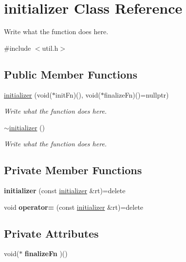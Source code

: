 \hypertarget{classinitializer}{\section{initializer Class Reference}
\label{classinitializer}
}


Write what the function does here.  




{\ttfamily \#include $<$util.\+h$>$}

\subsection*{Public Member Functions}
\begin{DoxyCompactItemize}
\item 
\hyperlink{classinitializer_ad7eff8ec9662dda6c90a5eebbb5bb774}{initializer} (void($\ast$init\+Fn)(), void($\ast$finalize\+Fn)()=nullptr)
\begin{DoxyCompactList}\small\item\em Write what the function does here. \end{DoxyCompactList}\item 
\hyperlink{classinitializer_a9ac296c0a8420f783af46a77792f4253}{$\sim$initializer} ()
\begin{DoxyCompactList}\small\item\em Write what the function does here. \end{DoxyCompactList}\end{DoxyCompactItemize}
\subsection*{Private Member Functions}
\begin{DoxyCompactItemize}
\item 
\hypertarget{classinitializer_a040920f2a1db4d0545d84c81ec6319d9}{{\bfseries initializer} (const \hyperlink{classinitializer}{initializer} \&rt)=delete}\label{classinitializer_a040920f2a1db4d0545d84c81ec6319d9}

\item 
\hypertarget{classinitializer_a622a590c3eeac8414877886cddb3c133}{void {\bfseries operator=} (const \hyperlink{classinitializer}{initializer} \&rt)=delete}\label{classinitializer_a622a590c3eeac8414877886cddb3c133}

\end{DoxyCompactItemize}
\subsection*{Private Attributes}
\begin{DoxyCompactItemize}
\item 
\hypertarget{classinitializer_abb0e43532e705e711cb64318defa0a4f}{void($\ast$ {\bfseries finalize\+Fn} )()}\label{classinitializer_abb0e43532e705e711cb64318defa0a4f}

\end{DoxyCompactItemize}


